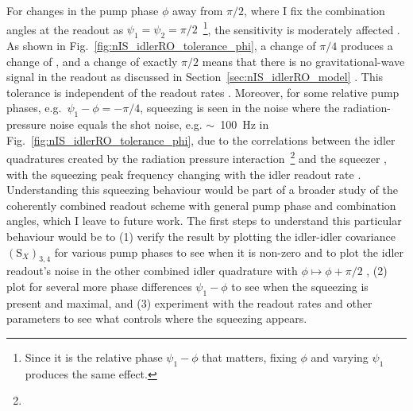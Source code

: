 For changes in the pump phase $\phi$ away from $\pi/2$, where I fix the combination angles at the readout as $\psi_1=\psi_2=\pi/2$~\footnote{Since it is the relative phase $\psi_1-\phi$ that matters, fixing $\phi$ and varying $\psi_1$ produces the same effect.}, the sensitivity is moderately affected . As shown in Fig.~\ref{fig:nIS_idlerRO_tolerance_phi}, a change of $\pi/4$ produces a change of , and a change of exactly $\pi/2$ means that there is no gravitational-wave signal in the readout as discussed in Section~\ref{sec:nIS_idlerRO_model} . This tolerance is independent of the readout rates  . Moreover, for some relative pump phases, e.g.\ $\psi_1-\phi=-\pi/4$, squeezing is seen in the noise where the radiation-pressure noise equals the shot noise, e.g. $\sim$~100~Hz in Fig.~\ref{fig:nIS_idlerRO_tolerance_phi}, due to the correlations between the idler quadratures created by the radiation pressure interaction~\footnote{}  and the squeezer , with the squeezing peak frequency changing with the idler readout rate . Understanding this squeezing behaviour would be part of a broader study of the coherently combined readout scheme with general pump phase and combination angles, which I leave to future work. The first steps to understand this particular behaviour would be to (1) verify the result by plotting the idler-idler covariance $(\text{S}_X)_{3,4}$ for various pump phases to see when it is non-zero and to plot the idler readout's noise in the other combined idler quadrature with $\phi\mapsto\phi+\pi/2$ , (2) plot for several more phase differences $\psi_1-\phi$ to see when the squeezing is present and maximal, and (3) experiment with the readout rates and other parameters to see what controls where the squeezing appears.

